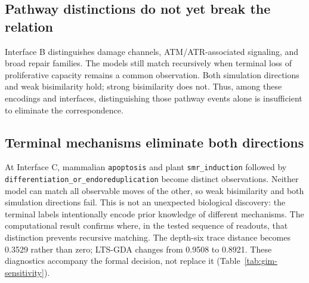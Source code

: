 \subsection{Pathway distinctions do not yet break the relation}
Interface B distinguishes damage channels, ATM/ATR-associated signaling, and
broad repair families. The models still match recursively when terminal
loss of proliferative capacity remains a common observation. Both simulation
directions and weak bisimilarity hold; strong bisimilarity does not.
Thus, among these encodings and interfaces, distinguishing those pathway
events alone is insufficient to eliminate the correspondence.

\subsection{Terminal mechanisms eliminate both directions}
At Interface C, mammalian \texttt{apoptosis} and plant
\texttt{smr\_induction} followed by
\texttt{differentiation\_or\_endoreduplication} become distinct observations.
Neither model can match all observable moves of the other, so weak
bisimilarity and both simulation directions fail. This is not an unexpected
biological discovery: the terminal labels intentionally encode prior knowledge
of different mechanisms. The computational result confirms where, in the
tested sequence of readouts, that distinction prevents recursive matching.
The depth-six trace distance becomes 0.3529 rather than zero; LTS-GDA changes
from 0.9508 to 0.8921. These diagnostics accompany the formal decision, not
replace it (Table~\ref{tab:gim-sensitivity}).

\begin{table}[t]
\end{table}

